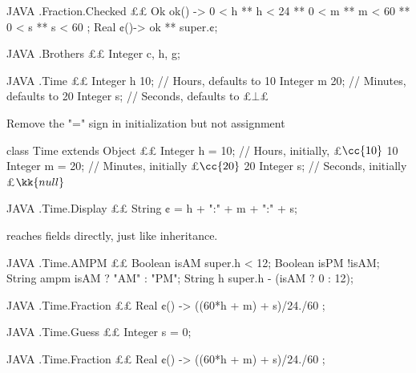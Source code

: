 \begin{code}{JAVA}
.Fraction.Checked {££
  Ok ok() -> 
    0 < h ** h < 24 ** 
    0 < m ** m < 60 ** 
    0 < s ** s < 60 ;
  Real ¢()->  ok ** super.¢; 
}
\end{code}


\begin{code}{JAVA}
.Brothers {££
Integer c, h, g;
}
\end{code}

\begin{code}{JAVA}
.Time {££
  Integer h 10; // Hours, defaults to 10 
  Integer m 20; // Minutes, defaults to 20 
  Integer s;    // Seconds, defaults to £$⊥$£  
}
\end{code}
Remove the "=" sign in initialization but not assignment 
\begin{java}
class Time extends Object {££
  Integer h = 10; // Hours, initially, £$\cc{10}$ 10 
  Integer m = 20; // Minutes, initially £$\cc{20}$ 20 
  Integer s;      // Seconds, initially £$\kk{null}$ 
}
\end{java}

\begin{code}{JAVA}
.Time.Display {££
  String ¢ = h + ":" + m + ":" + s;    
}
\end{code}
reaches fields directly, just like inheritance.

\begin{code}{JAVA}
.Time.AMPM {££
  Boolean isAM  super.h < 12;
  Boolean isPM  !isAM;
  String  ampm  isAM ? "AM" : "PM"; 
  String  h     super.h - (isAM ? 0 : 12);    
}
\end{code}

\begin{code}{JAVA}
.Time.Fraction {££
  Real ¢() -> ((60*h + m) + s)/24./60 ;
}
\end{code}


\begin{code}{JAVA}
.Time.Guess {££
  Integer s = 0; 
}
\end{code}

\begin{code}{JAVA}
.Time.Fraction {££
  Real ¢() -> ((60*h + m) + s)/24./60 ;
}
\end{code}



